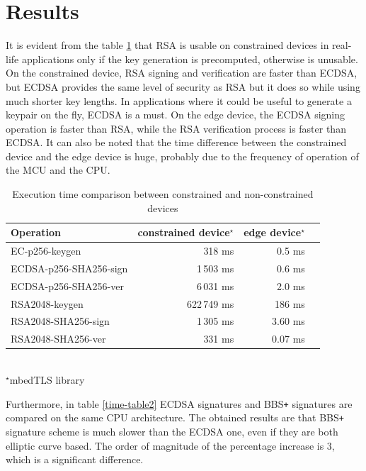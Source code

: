 \section{Results}
It is evident from the table \ref{time-table1} that RSA is usable on constrained devices in real-life applications only if the key generation is precomputed, otherwise is unusable. On the constrained device, RSA signing and verification are faster than ECDSA, but ECDSA provides the same level of security as RSA but it does so while using much shorter key lengths. In applications where it could be useful to generate a keypair on the fly, ECDSA is a must. On the edge device, the ECDSA signing operation is faster than RSA, while the RSA verification process is faster than ECDSA.  It can also be noted that the time difference between the constrained device and the edge device is huge, probably due to the frequency of operation of the MCU and the CPU.

\begin{table}[!h]
    \centering
    \begin{tabular}{| l || r | r | r |}
        \hline      
        \textbf{Operation} & \textbf{constrained device}$^\star$ & \textbf{edge device}$^\star$ \\ [0.5ex] 
        \hline \hline 
        EC-p256-keygen                  & 318 ms  & 0.5 ms \\
        \hline
        ECDSA-p256-SHA256-sign          & 1\,503 ms & 0.6 ms \\
        \hline
        ECDSA-p256-SHA256-ver           & 6\,031 ms & 2.0 ms \\
        \hline \hline
        RSA2048-keygen                  & 622\,749 ms  & 186  ms \\
        \hline
        RSA2048-SHA256-sign          & 1\,305 ms & 3.60 ms \\
        \hline
        RSA2048-SHA256-ver           & 331 ms & 0.07  ms \\
        \hline
    \end{tabular}\\
    \footnotesize $^\star$mbedTLS library
    \caption{Execution time comparison between constrained and non-constrained devices}
    \label{time-table1}
\end{table}

Furthermore, in table \ref{time-table2} ECDSA signatures and BBS\texttt{+} signatures are compared on the same CPU architecture. The obtained results are that BBS\texttt{+} signature scheme is much slower than the ECDSA one, even if they are both elliptic curve based. The order of magnitude of the percentage increase is 3, which is a significant difference. 
   

